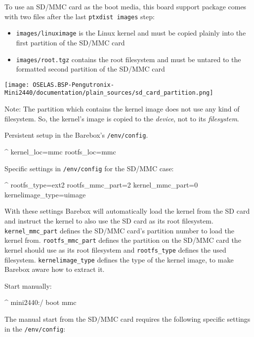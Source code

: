 To use an SD/MMC card as the boot media, this board support package comes with
two files after the last \texttt{ptxdist images} step:

\begin{itemize}
\item \texttt{\ptxdistPlatformDir images/linuximage} is the Linux kernel
	and must be copied plainly into the first partition of the SD/MMC card
\item \texttt{\ptxdistPlatformDir images/root.tgz} contains the root filesystem
	and must be untared to the formatted second partition of the SD/MMC card
\end{itemize}

\centerline{\texttt{[image: OSELAS.BSP-Pengutronix-Mini2440/documentation/plain\_sources/sd\_card\_partition.png]}}

Note: The partition which contains the kernel image does not use any kind of
filesystem. So, the kernel's image is copied to the \textit{device}, not to
its \textit{filesystem}.

Persistent setup in the Barebox's \texttt{/env/config}.

\begin{ptxshell}[escapechar=|]{^}
kernel_loc=mmc
rootfs_loc=mmc
\end{ptxshell}

Specific settings in \texttt{/env/config} for the SD/MMC case:

\begin{ptxshell}[escapechar=|]{^}
rootfs_type=ext2
rootfs_mmc_part=2
kernel_mmc_part=0
kernelimage_type=uimage
\end{ptxshell}

With these settings Barebox will automatically load the kernel from the SD card
and instruct the kernel to also use the SD card as its root filesystem.
\texttt{kernel\_mmc\_part} defines the SD/MMC card's partition number to load the
kernel from. \texttt{rootfs\_mmc\_part} defines the partition on the SD/MMC card
the kernel should use as its root filesystem and \texttt{rootfs\_type}
defines the used filesystem. \texttt{kernelimage\_type} defines the type of the
kernel image, to make Barebox aware how to extract it.

Start manually:

\begin{ptxshell}[escapechar=|]{^}
mini2440:/ boot mmc
\end{ptxshell}

The manual start from the SD/MMC card requires the following specific settings
in the \texttt{/env/config}:

